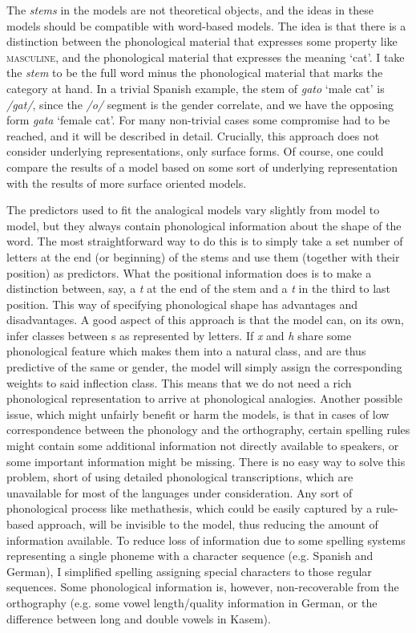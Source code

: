 The \textit{stems} in the models are not theoretical objects, and the ideas in these models should be compatible with word-based models. The idea is that there is a distinction between the phonological material that expresses some property like \textsc{masculine}, and the phonological material that expresses the meaning `cat'. I take the \textit{stem} to be the full word minus the phonological material that marks the category at hand. In a trivial Spanish example, the stem of \textit{gato} `male cat' is \textit{/gat/}, since the \textit{/o/} segment is the gender correlate, and we have the opposing form \textit{gata} `female cat'. For many non-trivial cases some compromise had to be reached, and it will be described in detail. Crucially, this approach does not consider underlying representations, only surface forms. Of course, one could compare the results of a model based on some sort of underlying representation with the results of more surface oriented models.

The predictors used to fit the analogical models vary slightly from model to model, but they always contain phonological information about the shape of the word. The most straightforward way to do this is to simply take a set number of letters at the end (or beginning) of the stems and use them (together with their position) as predictors. What the positional information does is to make a distinction between, say, a \textit{t} at the end of the stem and a \textit{t} in the third to last position. This way of specifying phonological shape has advantages and disadvantages. A good aspect of this approach is that the model can, on its own, infer classes between s as represented by letters. If \textit{x} and \textit{h} share some phonological feature which makes them into a natural class, and are thus predictive of the same  or gender, the model will simply assign the corresponding weights to said inflection class. This means that we do not need a rich phonological representation to arrive at phonological analogies. Another possible issue, which might unfairly benefit or harm the models, is that in cases of low correspondence between the phonology and the orthography, certain spelling rules might contain some additional information not directly available to speakers, or some important information might be missing. There is no easy way to solve this problem, short of using detailed phonological transcriptions, which are unavailable for most of the languages under consideration. Any sort of phonological process like methathesis, which could be easily captured by a rule-based approach, will be invisible to the model, thus reducing the amount of information available. To reduce loss of information due to some spelling systems representing a single phoneme with a character sequence (e.g. Spanish and German), I simplified spelling assigning special characters to those regular sequences. Some phonological information is, however, non-recoverable from the orthography (e.g. some vowel length/quality information in German, or the difference between long and double vowels in Kasem).

